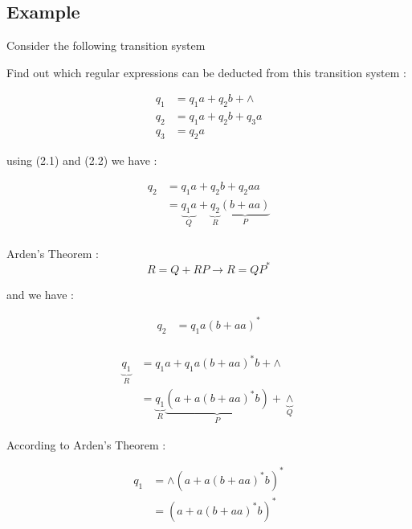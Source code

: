 \documentclass[12pt]{book}
\begin{document}
\subsection{Example}

Consider the following transition system 



Find out which regular expressions can be deducted from this transition system :


\begin{align}
q_{1} &= q_{1}a + q_{2}b + \wedge \\
q_{2} &= q_{1}a + q_{2}b + q_{3}a \\
q_{3} &= q_{2}a 
\end{align}

using (2.1) and (2.2) we have :


\begin{align*}
q_{2} &= q_{1}a + q_{2}b + q_{2}aa \\
 &= \underbrace{q_{1}a}_{Q} + \underbrace{q_{2}}_{R}\underbrace{(b + aa)}_{P} \\
\end{align*}

Arden's Theorem :
$$
R = Q + RP \to R = QP^{*}
$$

and we have :

\begin{align*}
q_{2} &= q_{1}a (b + aa)^{*} \\
\end{align*}


\begin{align*}
\underbrace{q_{1}}_{R} &= q_{1}a + q_{1}a(b + aa)^{*} b + \wedge \\
&= \underbrace{q_{1}}_{R} \underbrace{(a + a(b+aa)^{*}b)}_{P} + \underbrace{\wedge}_{Q}
\end{align*}

According to Arden's Theorem :

\begin{align*}
q_{1} &=  \wedge (a + a(b+aa)^{*}b)^{*} \\
&=  (a + a(b+aa)^{*}b)^{*} 
\end{align*}
\end{document}
